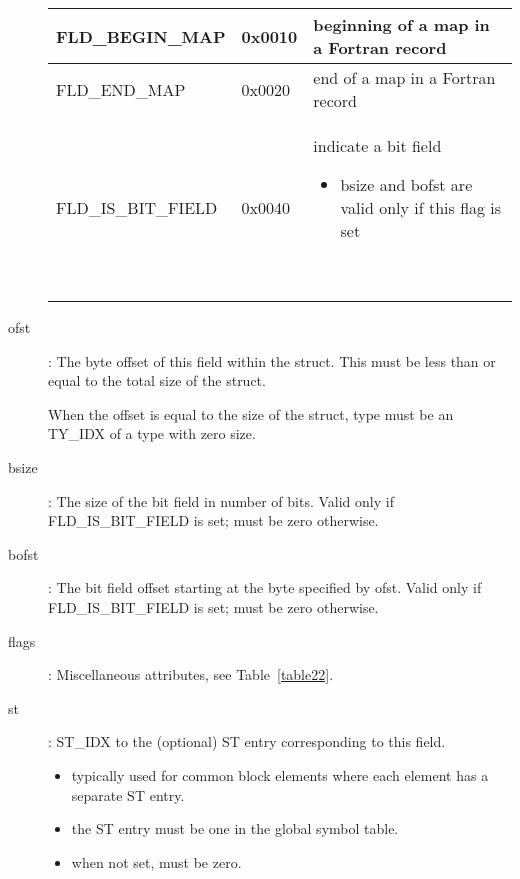\begin{description}
\begin{table}
\begin{tabular}{|l|l|p{3in}|}
\index{FLD\_BEGIN\_MAP}%
FLD\_BEGIN\_MAP & 0x0010 & beginning of a map in a Fortran record \\\hline

\index{FLD\_END\_MAP}%
FLD\_END\_MAP & 0x0020 & end of a map in a Fortran record \\\hline

\index{FLD\_IS\_BIT\_FIELD}%
FLD\_IS\_BIT\_FIELD & 0x0040 & 
\begin{minipage}{3in}
indicate a bit field
\begin{itemize}
\item bsize and bofst are valid only if this flag is set
\end{itemize}
~
\end{minipage}\\\hline
\end{tabular}
\end{table}


\item[ofst]: The byte offset of this field within the struct. This must
  be less than or equal to the total size of the struct.

When the offset is equal to the size of the struct, type must be an
%
TY\_IDX of a type with zero size.

\item[bsize]: The size of the bit field in number of bits. Valid only if
%
FLD\_IS\_BIT\_FIELD is set; must be zero otherwise.

\item[bofst]: The bit field offset starting at the byte specified by
ofst. Valid only if
%
FLD\_IS\_BIT\_FIELD is set; must be zero otherwise.

\item[flags]: Miscellaneous attributes, see Table~\ref{table22}. 

\item[st]:
%
ST\_IDX to the (optional)
%
ST entry corresponding to this field.

\begin{itemize}
\item
typically used for common block elements where each element
has a separate
%
ST entry.

\item the
%
ST entry must be one in the global symbol
table. 
\item  when not set, must be zero.
\end{itemize}
\end{description}


